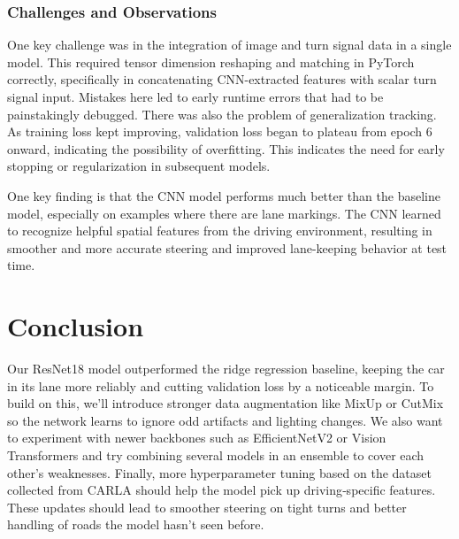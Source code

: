 \documentclass{article} %
\begin{document}
\subsubsection{Challenges and Observations}

One key challenge was in the integration of image and turn signal data in a single model. This required tensor dimension reshaping and matching in PyTorch correctly, specifically in concatenating CNN-extracted features with scalar turn signal input. Mistakes here led to early runtime errors that had to be painstakingly debugged.
There was also the problem of generalization tracking. As training loss kept improving, validation loss began to plateau from epoch 6 onward, indicating the possibility of overfitting. This indicates the need for early stopping or regularization in subsequent models.


One key finding is that the CNN model performs much better than the baseline model, especially on examples where there are lane markings. The CNN learned to recognize helpful spatial features from the driving environment, resulting in smoother and more accurate steering and improved lane-keeping behavior at test time. 

\section{Conclusion}

Our ResNet18 model outperformed the ridge regression baseline, keeping the car in its lane more reliably and 
cutting validation loss by a noticeable margin. To build on this, we’ll introduce stronger data augmentation like MixUp or 
CutMix so the network learns to ignore odd artifacts and lighting changes. We also want to experiment with newer backbones 
such as EfficientNetV2 or Vision Transformers and try combining several models in an ensemble to cover each other’s weaknesses. 
Finally, more hyperparameter tuning based on the dataset collected from CARLA should help the model pick up 
driving‑specific features. 
These updates should lead to smoother steering on tight turns and better handling of roads the model hasn’t seen before.
\label{last_page}
\end{document}

